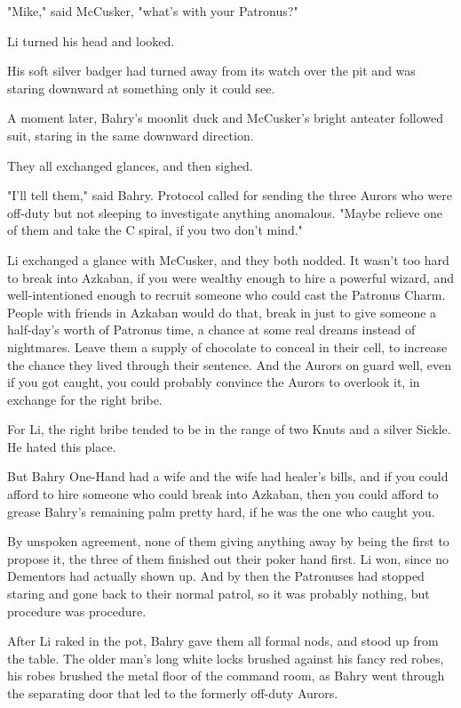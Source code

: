"Mike," said McCusker, "what's with your Patronus?"

Li turned his head and looked.

His soft silver badger had turned away from its watch over the pit and was
staring downward at something only it could see.

A moment later, Bahry's moonlit duck and McCusker's bright anteater followed
suit, staring in the same downward direction.

They all exchanged glances, and then sighed.

"I'll tell them," said Bahry. Protocol called for sending the three Aurors who
were off-duty but not sleeping to investigate anything anomalous. "Maybe
relieve one of them and take the C spiral, if you two don't mind."

Li exchanged a glance with McCusker, and they both nodded. It wasn't too hard
to break into Azkaban, if you were wealthy enough to hire a powerful wizard,
and well-intentioned enough to recruit someone who could cast the Patronus
Charm. People with friends in Azkaban would do that, break in just to give
someone a half-day's worth of Patronus time, a chance at some real dreams
instead of nightmares. Leave them a supply of chocolate to conceal in their
cell, to increase the chance they lived through their sentence. And the Aurors
on guard{\el} well, even if you got caught, you could probably convince the
Aurors to overlook it, in exchange for the right bribe.

For Li, the right bribe tended to be in the range of two Knuts and a silver
Sickle. He hated this place.

But Bahry One-Hand had a wife and the wife had healer's bills, and if you could
afford to hire someone who could break into Azkaban, then you could afford to
grease Bahry's remaining palm pretty hard, if he was the one who caught you.

By unspoken agreement, none of them giving anything away by being the first to
propose it, the three of them finished out their poker hand first. Li won,
since no Dementors had actually shown up. And by then the Patronuses had
stopped staring and gone back to their normal patrol, so it was probably
nothing, but procedure was procedure.

After Li raked in the pot, Bahry gave them all formal nods, and stood up from
the table. The older man's long white locks brushed against his fancy red
robes, his robes brushed the metal floor of the command room, as Bahry went
through the separating door that led to the formerly off-duty Aurors.

